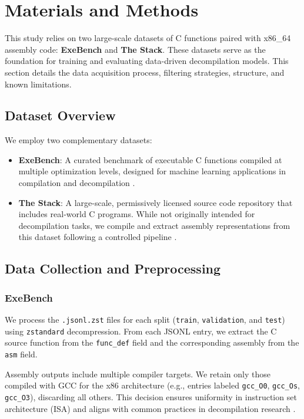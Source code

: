 \documentclass[../main.tex]{subfiles}
\begin{document}
\section{Materials and Methods}

This study relies on two large-scale datasets of C functions paired with x86\_64 assembly code: \textbf{ExeBench} and \textbf{The Stack}. These datasets serve as the foundation for training and evaluating data-driven decompilation models. This section details the data acquisition process, filtering strategies, structure, and known limitations.

\subsection{Dataset Overview}

We employ two complementary datasets:

\begin{itemize}
    \item \textbf{ExeBench}: A curated benchmark of executable C functions compiled at multiple optimization levels, designed for machine learning applications in compilation and decompilation \cite{armengol-estape_exebench_2022}.
    \item \textbf{The Stack}: A large-scale, permissively licensed source code repository that includes real-world C programs. While not originally intended for decompilation tasks, we compile and extract assembly representations from this dataset following a controlled pipeline \cite{kocetkov_stack_2022}.
\end{itemize}

\subsection{Data Collection and Preprocessing}

\subsubsection{ExeBench}

We process the \texttt{.jsonl.zst} files for each split (\texttt{train}, \texttt{validation}, and \texttt{test}) using \texttt{zstandard} decompression. From each JSONL entry, we extract the C source function from the \texttt{func\_def} field and the corresponding assembly from the \texttt{asm} field.

Assembly outputs include multiple compiler targets. We retain only those compiled with GCC for the x86 architecture (e.g., entries labeled \texttt{gcc\_O0}, \texttt{gcc\_Os}, \texttt{gcc\_O3}), discarding all others. This decision ensures uniformity in instruction set architecture (ISA) and aligns with common practices in decompilation research \cite{cao_boosting_2022}.
\end{document}
